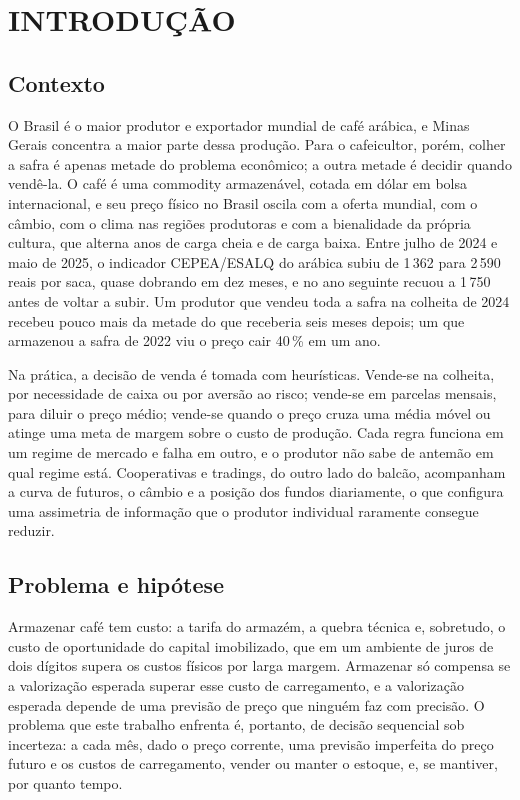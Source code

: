 \chapter{\MakeUppercase{Introdução}}\label{sec:introducao}

\section{Contexto}

O Brasil é o maior produtor e exportador mundial de café arábica, e Minas Gerais concentra a maior parte dessa produção. Para o cafeicultor, porém, colher a safra é apenas metade do problema econômico; a outra metade é decidir quando vendê-la. O café é uma commodity armazenável, cotada em dólar em bolsa internacional, e seu preço físico no Brasil oscila com a oferta mundial, com o câmbio, com o clima nas regiões produtoras e com a bienalidade da própria cultura, que alterna anos de carga cheia e de carga baixa. Entre julho de 2024 e maio de 2025, o indicador CEPEA/ESALQ do arábica subiu de 1\,362 para 2\,590 reais por saca, quase dobrando em dez meses, e no ano seguinte recuou a 1\,750 antes de voltar a subir. Um produtor que vendeu toda a safra na colheita de 2024 recebeu pouco mais da metade do que receberia seis meses depois; um que armazenou a safra de 2022 viu o preço cair 40\,\% em um ano.

Na prática, a decisão de venda é tomada com heurísticas. Vende-se na colheita, por necessidade de caixa ou por aversão ao risco; vende-se em parcelas mensais, para diluir o preço médio; vende-se quando o preço cruza uma média móvel ou atinge uma meta de margem sobre o custo de produção. Cada regra funciona em um regime de mercado e falha em outro, e o produtor não sabe de antemão em qual regime está. Cooperativas e tradings, do outro lado do balcão, acompanham a curva de futuros, o câmbio e a posição dos fundos diariamente, o que configura uma assimetria de informação que o produtor individual raramente consegue reduzir.

\section{Problema e hipótese}

Armazenar café tem custo: a tarifa do armazém, a quebra técnica e, sobretudo, o custo de oportunidade do capital imobilizado, que em um ambiente de juros de dois dígitos supera os custos físicos por larga margem. Armazenar só compensa se a valorização esperada superar esse custo de carregamento, e a valorização esperada depende de uma previsão de preço que ninguém faz com precisão. O problema que este trabalho enfrenta é, portanto, de decisão sequencial sob incerteza: a cada mês, dado o preço corrente, uma previsão imperfeita do preço futuro e os custos de carregamento, vender ou manter o estoque, e, se mantiver, por quanto tempo.

